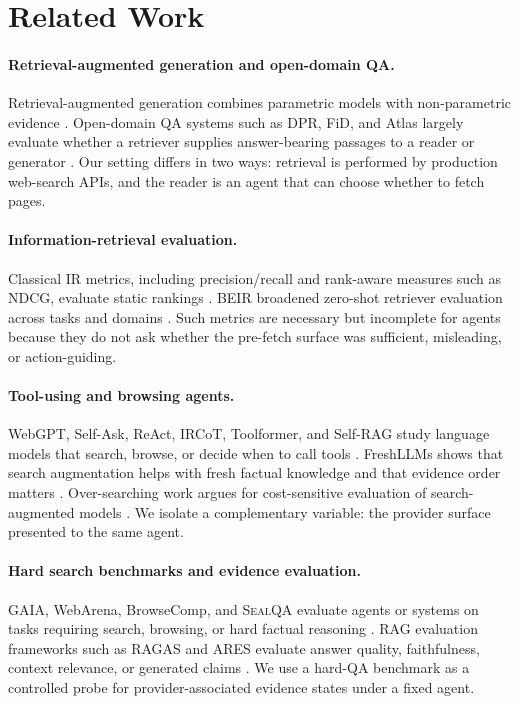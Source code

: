 \section{Related Work}
\label{sec:related}

\paragraph{Retrieval-augmented generation and open-domain QA.}
Retrieval-augmented generation combines parametric models with non-parametric evidence \citep{lewis-etal-2020-retrieval,guu2020realm}. Open-domain QA systems such as DPR, FiD, and Atlas largely evaluate whether a retriever supplies answer-bearing passages to a reader or generator \citep{karpukhin2020dense,izacard-grave-2021-leveraging,izacard2023atlas}. Our setting differs in two ways: retrieval is performed by production web-search APIs, and the reader is an agent that can choose whether to fetch pages.

\paragraph{Information-retrieval evaluation.}
Classical IR metrics, including precision/recall and rank-aware measures such as NDCG, evaluate static rankings \citep{jarvelin2002cumulated,manning2008introduction}. BEIR broadened zero-shot retriever evaluation across tasks and domains \citep{thakur-etal-2021-beir}. Such metrics are necessary but incomplete for agents because they do not ask whether the pre-fetch surface was sufficient, misleading, or action-guiding.

\paragraph{Tool-using and browsing agents.}
WebGPT, Self-Ask, ReAct, IRCoT, Toolformer, and Self-RAG study language models that search, browse, or decide when to call tools \citep{nakano2021webgpt,press2022selfask,yao2023react,trivedi2022ircot,schick-etal-2023-toolformer,asai2023selfrag}. FreshLLMs shows that search augmentation helps with fresh factual knowledge and that evidence order matters \citep{vu2023freshllms}. Over-searching work argues for cost-sensitive evaluation of search-augmented models \citep{xie2026oversearching}. We isolate a complementary variable: the provider surface presented to the same agent.

\paragraph{Hard search benchmarks and evidence evaluation.}
GAIA, WebArena, BrowseComp, and \textsc{SealQA} evaluate agents or systems on tasks requiring search, browsing, or hard factual reasoning \citep{mialon2023gaia,zhou2023webarena,wei2025browsecomp,pham2025sealqa}. RAG evaluation frameworks such as RAGAS and ARES evaluate answer quality, faithfulness, context relevance, or generated claims \citep{es2024ragas,saadfalcon2024ares}. We use a hard-QA benchmark as a controlled probe for provider-associated evidence states under a fixed agent.

